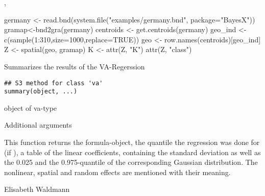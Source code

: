 \documentclass[a4paper]{book}
\begin{document}
%
\begin{SeeAlso}\relax
{}, 
\end{SeeAlso}
%
\begin{Examples}
\begin{ExampleCode}
germany <- read.bnd(system.file("examples/germany.bnd", package="BayesX"))
gramap<-bnd2gra(germany)
centroids <- get.centroids(germany)
geo_ind <- c(sample(1:310,size=1000,replace=TRUE))
geo <- row.names(centroids)[geo_ind]
Z <- spatial(geo, gramap)
K <- attr(Z, "K")
attr(Z, "class")
\end{ExampleCode}
\end{Examples}
%
\begin{Description}\relax

Summarizes the results of the VA-Regerssion
\end{Description}
%
\begin{Usage}
\begin{verbatim}
## S3 method for class 'va'
summary(object, ...)
\end{verbatim}
\end{Usage}
%
\begin{Arguments}
\begin{ldescription}
\item[\code{object}] 
object of va-type
\item[\code{...}] Additional arguments

\end{ldescription}
\end{Arguments}
%
\begin{Details}\relax
This function returns the formula-object, the quantile the regression was done for (if ),
a table of the linear coefficients, containing the standard deviation as well as the 
0.025 and the 0.975-quantile of the corresponding Gaussian distribution. 
The nonlinear, spatial and random effects are mentioned with their meaning.
\end{Details}
%
\begin{Author}\relax
Elisabeth Waldmann \\{}

\end{Author}
\end{document}
